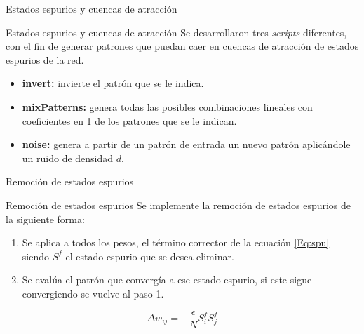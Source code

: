 \documentclass{beamer}
\begin{document}
\begin{frame}{Estados espurios y cuencas de atracción}
\begin{block}{Estados espurios y cuencas de atracción}
Se desarrollaron tres \textit{scripts} diferentes, con el fin de generar patrones que puedan caer en cuencas de atracción de estados espurios de la red. \\

\begin{itemize}
\item \textbf{invert:} invierte el patrón que se le indica.
\item \textbf{mixPatterns:} genera todas las posibles combinaciones lineales con coeficientes en 1 de los patrones que se le indican.
\item \textbf{noise:} genera a partir de un patrón de entrada un nuevo patrón aplicándole un ruido de densidad $d$.
 \end{itemize}
 \end{block}
\end{frame}

\begin{frame}{Remoción de estados espurios}
\begin{block}{Remoción de estados espurios}
Se implemente la remoción de estados espurios de la siguiente forma: \\
\begin{enumerate}
 \item Se aplica a todos los pesos, el término corrector de la ecuación \ref{Eq:spu} siendo $S^f$ el estado espurio que se desea eliminar.
 \item Se evalúa el patrón que convergía a ese estado espurio, si este sigue convergiendo se vuelve al paso 1.
\end{enumerate}
\begin{equation}
  \label{Eq:spu}
   \Delta w_{ij} = -\dfrac{\epsilon}{N} S^{f}_{i} S^{f}_{j}
\end{equation}
\end{block}
\end{frame}
\end{document}
